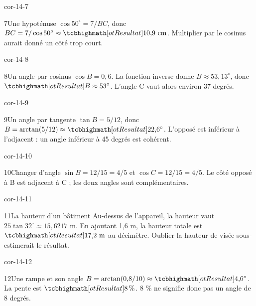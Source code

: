 \begin{blocLivre}{cor-14-7}\begin{corrige}{7}{Une hypoténuse}
$\cos50^\circ=7/BC$, donc $BC=7/\cos50^\circ\approx\res{10{,}9\text{ cm}}$. Multiplier par le cosinus aurait donné un côté trop court.
\label{fig-cor-14-7}
\end{corrige}\end{blocLivre}
\begin{blocLivre}{cor-14-8}\begin{corrige}{8}{Un angle par cosinus}
$\cos B=0{,}6$. La fonction inverse donne $B\approx53{,}13^\circ$, donc $\res{B\approx53^\circ}$. L’angle C vaut alors environ 37 degrés.
\label{fig-cor-14-8}
\end{corrige}\end{blocLivre}
\begin{blocLivre}{cor-14-9}\begin{corrige}{9}{Un angle par tangente}
$\tan B=5/12$, donc $B=\arctan(5/12)\approx\res{22{,}6^\circ}$. L’opposé est inférieur à l’adjacent : un angle inférieur à 45 degrés est cohérent.
\label{fig-cor-14-9}
\end{corrige}\end{blocLivre}
\begin{blocLivre}{cor-14-10}\begin{corrige}{10}{Changer d’angle}
$\sin B=12/15=4/5$ et $\cos C=12/15=4/5$. Le côté opposé à B est adjacent à C ; les deux angles sont complémentaires.
\label{fig-cor-14-10}
\end{corrige}\end{blocLivre}
\begin{blocLivre}{cor-14-11}\begin{corrige}{11}{La hauteur d’un bâtiment}
Au-dessus de l’appareil, la hauteur vaut $25\tan32^\circ\approx15{,}6217$ m. En ajoutant 1,6 m, la hauteur totale est $\res{17{,}2\text{ m}}$ au décimètre. Oublier la hauteur de visée sous-estimerait le résultat.
\label{fig-cor-14-11}
\end{corrige}\end{blocLivre}
\begin{blocLivre}{cor-14-12}\begin{corrige}{12}{Une rampe et son angle}
$B=\arctan(0{,}8/10)\approx\res{4{,}6^\circ}$. La pente est $\res{8\,\%}$. 8 \% ne signifie donc pas un angle de 8 degrés.
\label{fig-cor-14-12}
\end{corrige}\end{blocLivre}
